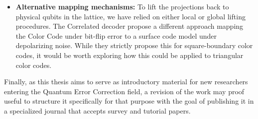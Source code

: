 \begin{itemize}
    \item \textbf{Alternative mapping mechanisms:} To lift the projections back to physical qubits in the lattice, we have relied on either local or global lifting procedures. The Correlated decoder \cite{liu2025correlatedmatchingdecoder488} propose a different approach mapping the Color Code under bit-flip error to a surface code model under depolarizing noise. While they strictly propose this for square-boundary color codes, it would be worth exploring how this could be applied to triangular color codes.
    
\end{itemize}

Finally, as this thesis aims to serve as introductory material for new researchers entering the Quantum Error Correction field, a revision of the work may proof useful to structure it specifically for that purpose with the goal of publishing it in a specialized journal that accepts survey and tutorial papers. 
